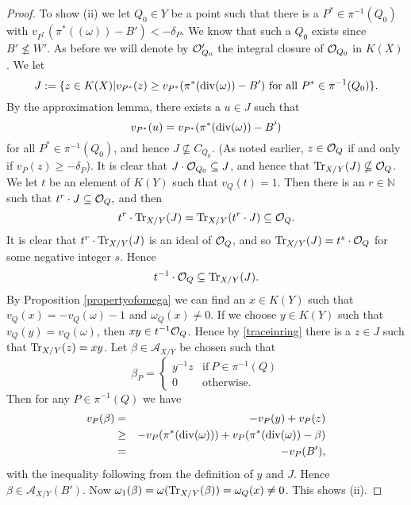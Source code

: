 \begin{proof}
To show (ii) we let $Q_0\in Y$ be a point such that there is a $P^*\in \pi^{-1}(Q_0)$ with $v_{P^*}(\pi^*((\omega)) - B') < -\delta_P$.
We know that such a $Q_0$ exists since $B' \nleq W'$.
As before we will denote by ${\cal O}_{Q_0}'$ the integral closure of ${\cal O}_{Q_0}$ in $K(X)$.
We let 
\[
 J := \{ z\in K(X) | v_{P^*}(z) \geq v_{P^*}(\pi^*(\operatorname{div} (\omega)) - B')\ \text{for all}\ P^*\in \pi^{-1}(Q_0)\}.
\]
By the approximation lemma, there exists a $u\in J$ such that 
\[
 v_{P^*}(u) = v_{P^*}(\pi^*(\operatorname{div} (\omega))-B')
 \]
 for all $P^*\in \pi^{-1}(Q_0)$, and hence $J\nsubseteq C_{Q_0}$.
(As noted earlier, $z\in {\cal O}_Q$ if and only if $v_P(z) \geq -\delta_P$).
It is clear that $J\cdot {\cal O}_{Q_0} \subseteq J$, and hence that $\operatorname{Tr}_{X/Y}(J) \nsubseteq {\cal O}_Q$.
We let $t$ be an element of $K(Y)$ such that $v_Q(t) = 1$.
Then there is an $r\in \mathbb N$ such that 
$t^r\cdot J \subseteq {\cal O}_Q,
 $
 and then \[ t^r\cdot \operatorname{Tr}_{X/Y}(J) = \operatorname{Tr}_{X/Y}(t^r\cdot J) \subseteq {\cal O}_Q.\]
It is clear that $t^r\cdot \operatorname{Tr}_{X/Y} (J)$ is an ideal of ${\cal O}_Q$, and so $\operatorname{Tr}_{X/Y}(J) = t^s\cdot {\cal O}_Q$ for some negative integer $s$.
Hence 
\begin{equation}\label{traceinring}
 t^{-1}\cdot {\cal O}_Q \subseteq \operatorname{Tr}_{X/Y}(J).
\end{equation}
By Proposition \ref{propertyofomega} we can find an $x\in K(Y)$ such that $v_Q(x) = -v_Q(\omega) - 1$ and $\omega_Q(x) \neq 0$.
If we choose $y\in K(Y)$ such that $v_Q(y) = v_Q(\omega)$, then $xy \in t^{-1}{\cal O}_Q$.
Hence by \eqref{traceinring} there is a $z\in J$ such that $\operatorname{Tr}_{X/Y} (z) = xy$.
Let $\beta \in \mathcal{A}_{X/Y}$ be chosen  such that 
\begin{equation*}
 \beta_P = \begin{cases}
            y^{-1}z & \text{if}\ P\in \pi^{-1}(Q) \\
            0 & \text{otherwise}.
           \end{cases}
\end{equation*}
Then for any $P\in \pi^{-1}(Q)$ we have
\begin{eqnarray*}
 v_P(\beta) & = & -v_P(y) + v_P(z) \\
 & \geq & -v_P(\pi^*(\operatorname{div} (\omega))) + v_P(\pi^*(\operatorname{div} (\omega)) - \beta) \\
 & = & -v_P(B'),
\end{eqnarray*}
with the inequality following from the definition of $y$ and $J$.
Hence $\beta \in \mathcal{A}_{X/Y}(B')$.
Now $\omega_1(\beta) = \omega(\operatorname{Tr}_{X/Y}(\beta)) = \omega_Q(x) \neq 0$.
This shows (ii).


\end{proof}

